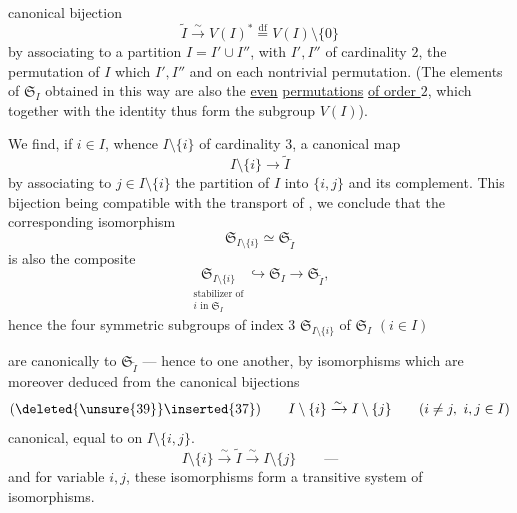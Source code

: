 
canonical bijection
\[
\tag{33}
\widetilde I \xrightarrow{\sim} V(I)^*
\overset{\mathrm{df}}{=} V(I)\setminus\{0\}
\]
by associating to a partition $I=I'\cup I''$, with
$I',I''$ of cardinality $2$, the  permutation
 of $I$
 which  $I',I''$ and  on
each  nontrivial permutation. (The elements
of $\mathfrak{S}_I$ obtained in this way are also the \uline{even}
\uline{permutations} \uline{of order $2$}, \deleted{\unsure{)}} which together with the identity thus form
the subgroup $V(I)$).

We find, if $i\in I$, whence $I\setminus\{i\}$ of
cardinality $3$,  a canonical map
\[
\tag{34}
I\setminus\{i\}\longrightarrow\widetilde I
\]
by associating to $j\in I\setminus\{i\}$ the partition
of $I$ into $\{i,j\}$ and its complement.
This bijection being compatible with the
transport of , we conclude
that the corresponding isomorphism
\[
\tag{35}
\mathfrak{S}_{I\setminus\{i\}}\simeq\mathfrak{S}_{\widetilde I}
\]
 is  also the composite
\[
\tag{36}
\underset{\substack{\text{stabilizer of}\\ i\text{ in }\mathfrak{S}_I}}
{\mathfrak{S}_{I\setminus\{i\}}}
\hookrightarrow\mathfrak{S}_I\longrightarrow\mathfrak{S}_{\widetilde I},
\]
hence the four symmetric subgroups
of index $3$ $\mathfrak{S}_{I\setminus\{i\}}$ of $\mathfrak{S}_I$ $(i\in I)$

are canonically  to $\mathfrak{S}_{\widetilde I}$
--- hence to one another,  by isomorphisms which
 are  moreover  deduced from the canonical
bijections 
\[
  (\deleted{\unsure{39}}\inserted{37})\qquad
  I\setminus\{i\}\xrightarrow{\sim}I\setminus\{j\}
  \qquad(i\ne j,\ i,j\in I)
\]
canonical, equal to 
 on $I\setminus\{i,j\}$.
\[
  I\setminus\{i\}\xrightarrow{\sim}\widetilde I
  \xrightarrow{\sim}I\setminus\{j\}
  \qquad\text{---}
\]
and for variable $i,j$, these isomorphisms form a
transitive system of isomorphisms.


